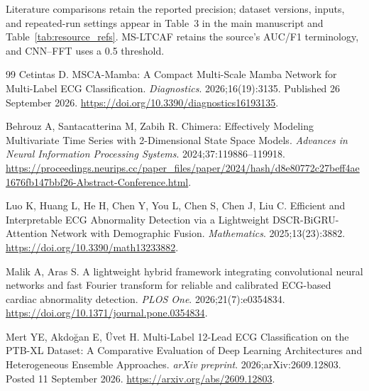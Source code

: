 \documentclass[11pt,a4paper]{article}
\begin{document}
Literature comparisons retain the reported precision; dataset versions, inputs, and repeated-run settings appear in Table~3 in the main manuscript and Table~\ref{tab:resource_refs}. MS-LTCAF retains the source's AUC/F1 terminology, and CNN--FFT uses a 0.5 threshold.

\begingroup
\setlength{\bibsep}{3pt}
\begin{thebibliography}{99}
 Cetintas D. MSCA-Mamba: A Compact Multi-Scale Mamba Network for Multi-Label ECG Classification. \emph{Diagnostics}. 2026;16(19):3135. Published 26 September 2026. \url{https://doi.org/10.3390/diagnostics16193135}.

 Behrouz A, Santacatterina M, Zabih R. Chimera: Effectively Modeling Multivariate Time Series with 2-Dimensional State Space Models. \emph{Advances in Neural Information Processing Systems}. 2024;37:119886--119918. \url{https://proceedings.neurips.cc/paper_files/paper/2024/hash/d8e80772c27beff4ae1676fb147bbf26-Abstract-Conference.html}.

 Luo K, Huang L, He H, Chen Y, You L, Chen S, Chen J, Liu C. Efficient and Interpretable ECG Abnormality Detection via a Lightweight DSCR-BiGRU-Attention Network with Demographic Fusion. \emph{Mathematics}. 2025;13(23):3882. \url{https://doi.org/10.3390/math13233882}.

 Malik A, Aras S. A lightweight hybrid framework integrating convolutional neural networks and fast Fourier transform for reliable and calibrated ECG-based cardiac abnormality detection. \emph{PLOS One}. 2026;21(7):e0354834. \url{https://doi.org/10.1371/journal.pone.0354834}.

 Mert YE, Akdo\u{g}an E, \"{U}vet H. Multi-Label 12-Lead ECG Classification on the PTB-XL Dataset: A Comparative Evaluation of Deep Learning Architectures and Heterogeneous Ensemble Approaches. \emph{arXiv preprint}. 2026;arXiv:2609.12803. Posted 11 September 2026. \url{https://arxiv.org/abs/2609.12803}.
\end{thebibliography}
\endgroup
\end{document}
